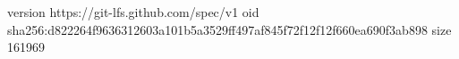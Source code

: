 version https://git-lfs.github.com/spec/v1
oid sha256:d822264f9636312603a101b5a3529ff497af845f72f12f12f660ea690f3ab898
size 161969
